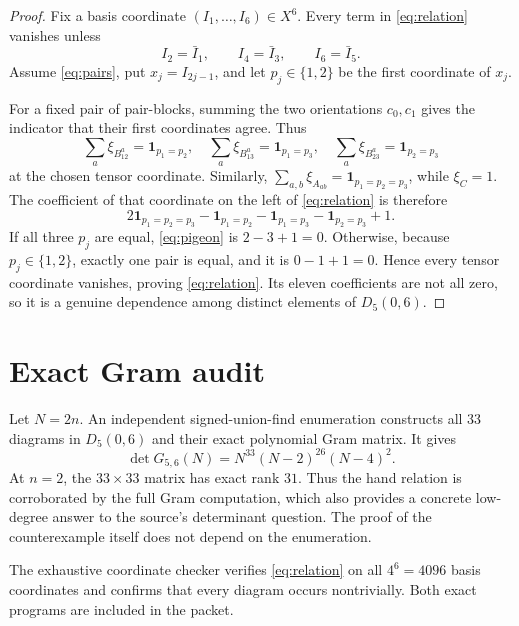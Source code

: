 \documentclass[10pt]{article}
\newcommand{\one}{\mathbf 1}
\newcommand{\xiP}{\xi}
\begin{document}
\begin{proof}
Fix a basis coordinate $(I_1,\ldots,I_6)\in X^6$.  Every term in
\eqref{eq:relation} vanishes unless
\begin{equation}\label{eq:pairs}
 I_2=\bar I_1,\qquad I_4=\bar I_3,\qquad I_6=\bar I_5.
\end{equation}
Assume \eqref{eq:pairs}, put $x_j=I_{2j-1}$, and let
$p_j\in\{1,2\}$ be the first coordinate of $x_j$.

For a fixed pair of pair-blocks, summing the two orientations $c_0,c_1$
gives the indicator that their first coordinates agree.  Thus
\[
 \sum_a\xiP_{B_{12}^a}=\one_{p_1=p_2},\quad
 \sum_a\xiP_{B_{13}^a}=\one_{p_1=p_3},\quad
 \sum_a\xiP_{B_{23}^a}=\one_{p_2=p_3}
\]
at the chosen tensor coordinate.  Similarly,
$\sum_{a,b}\xiP_{A_{ab}}=\one_{p_1=p_2=p_3}$, while $\xiP_C=1$.
The coefficient of that coordinate on the left of \eqref{eq:relation} is
therefore
\begin{equation}\label{eq:pigeon}
 2\one_{p_1=p_2=p_3}
 -\one_{p_1=p_2}-\one_{p_1=p_3}-\one_{p_2=p_3}+1.
\end{equation}
If all three $p_j$ are equal, \eqref{eq:pigeon} is $2-3+1=0$.
Otherwise, because $p_j\in\{1,2\}$, exactly one pair is equal, and it is
$0-1+1=0$.  Hence every tensor coordinate vanishes, proving
\eqref{eq:relation}.  Its eleven coefficients are not all zero, so it is a
genuine dependence among distinct elements of $D_5(0,6)$.
\end{proof}

\section*{Exact Gram audit}
Let $N=2n$.  An independent signed-union-find enumeration constructs all
33 diagrams in $D_5(0,6)$ and their exact polynomial Gram matrix.  It gives
\begin{equation}\label{eq:det}
 \det G_{5,6}(N)=N^{33}(N-2)^{26}(N-4)^2.
\end{equation}
At $n=2$, the $33\times33$ matrix has exact rank $31$.  Thus the hand
relation is corroborated by the full Gram computation, which also provides a
concrete low-degree answer to the source's determinant question.  The proof
of the counterexample itself does not depend on the enumeration.

The exhaustive coordinate checker verifies \eqref{eq:relation} on all
$4^6=4096$ basis coordinates and confirms that every diagram occurs
nontrivially.  Both exact programs are included in the packet.
\end{document}
